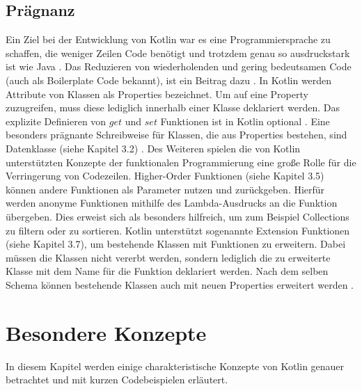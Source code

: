 \documentclass{article}
\begin{document}
\subsection{Prägnanz}
Ein Ziel bei der Entwicklung von Kotlin war es eine Programmiersprache zu schaffen, die weniger Zeilen Code benötigt und trotzdem genau so ausdruckstark ist wie Java \cite{Kotlin_In-D}. Das Reduzieren von wiederholenden und gering bedeutsamen Code (auch als Boilerplate Code bekannt), ist ein Beitrag dazu \cite{KotlinLangDoc}. In Kotlin werden Attribute von Klassen als Properties bezeichnet. Um auf eine Property zuzugreifen, muss diese lediglich innerhalb einer Klasse deklariert werden. Das explizite Definieren von $get$ und $set$ Funktionen ist in Kotlin optional \cite{KotlinLangDoc}. Eine besonders prägnante Schreibweise für Klassen, die aus Properties bestehen, sind Datenklasse (siehe Kapitel 3.2) \cite{KotlinLangDoc}.
Des Weiteren spielen die von Kotlin unterstützten Konzepte der funktionalen Programmierung eine große Rolle für die Verringerung von Codezeilen. Higher-Order Funktionen (siehe Kapitel 3.5) können andere Funktionen als Parameter nutzen und zurückgeben\cite{KotlinLangDoc}. Hierfür werden anonyme Funktionen mithilfe des Lambda-Ausdrucks an die Funktion übergeben. Dies erweist sich als besonders hilfreich, um zum Beispiel Collections zu filtern oder zu sortieren. \newline
Kotlin unterstützt sogenannte Extension Funktionen (siehe Kapitel 3.7), um bestehende Klassen mit Funktionen zu erweitern. Dabei müssen die Klassen nicht vererbt werden, sondern lediglich die zu erweiterte Klasse mit dem Name für die Funktion deklariert werden. Nach dem selben Schema können bestehende Klassen auch mit neuen Properties erweitert werden \cite{KotlinLangDoc}.

\section{Besondere Konzepte}
In diesem Kapitel werden einige charakteristische Konzepte von Kotlin genauer betrachtet und mit kurzen Codebeispielen erläutert.
\end{document}
